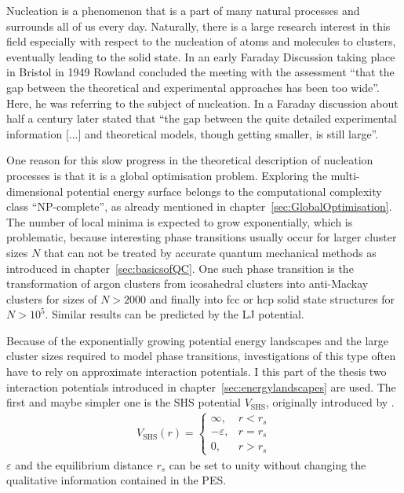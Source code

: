 Nucleation is a phenomenon that is a part of many natural processes and
surrounds all of us every day. Naturally, there is a large research interest in
this field especially with respect to the nucleation of atoms and molecules to
clusters, eventually leading to the solid
state.\autocite{Stillinger_Packingstructurestransitions_1984,
Martin-1996,Wales-1996, Vlieg_atomicscaleunderstandingcrystal_2007, Arkus-2010,
Woodley-2010, Karthika-2016, Holmes-Cerfon_StickySphereClusters_2017} In an
early Faraday Discussion taking place in Bristol in 1949 Rowland concluded the
meeting with the assessment ``that the gap between the theoretical and
experimental approaches has been too wide''.\autocite{Rowland-1949} Here, he was
referring to the subject of nucleation. In a Faraday discussion about half a
century later \citeauthor{Vlieg_atomicscaleunderstandingcrystal_2007} stated
that ``the gap between the quite detailed experimental information [...] and
theoretical models, though getting smaller, is still large''.\autocite{Vlieg_atomicscaleunderstandingcrystal_2007}

One reason for this slow progress in the theoretical description of nucleation
processes is that it is a global optimisation problem. Exploring the
multi-dimensional potential energy surface belongs to the computational
complexity class ``NP-complete'', as already mentioned in
chapter~\ref{sec:GlobalOptimisation}. The number of local minima is expected to
grow exponentially,\autocite{Stillinger_Packingstructurestransitions_1984,
Oganov-2006, Massen_Powerlawdistributionsareas_2007, wales10, Oganov-2011,
calvo12, Wales-2015} which is problematic, because interesting phase transitions
usually occur for larger cluster sizes $N$ that can not be treated by accurate
quantum mechanical methods as introduced in chapter~\ref{sec:basicsofQC}. One
such phase transition is the transformation of argon clusters from icosahedral
clusters into anti-Mackay clusters for sizes of $N>2000$ and finally into
\acf{fcc} or \acf{hcp} solid state structures for
$N>10^5$.\autocite{Krainyukova-2012} Similar results can be predicted by the
\acf{LJ} potential.\autocite{Martin-1996,
Schwerdtfeger_ExtensionLennardJonespotential_2006, Krainyukova-2007}

Because of the exponentially growing potential energy landscapes and the large
cluster sizes required to model phase transitions, investigations of this type
often have to rely on approximate interaction potentials. I this part of the
thesis two interaction potentials introduced in
chapter~\ref{sec:energylandscapes} are used. The first and maybe simpler one is
the \acf{SHS} potential $V_\mathrm{SHS}$, originally introduced by
\citeauthor{baxter68}\autocite{baxter68}.
%
\begin{align}
    V_\mathrm{SHS}(r)=\begin{cases}
        \infty, & r < r_s\\
        -\varepsilon, & r = r_s\\
        0, & r > r_s
    \end{cases}
\label{eqn:KS}
\end{align}
%
$\varepsilon$ and the equilibrium distance $r_s$ can be set to unity without
changing the qualitative information contained in the \ac{PES}. 

